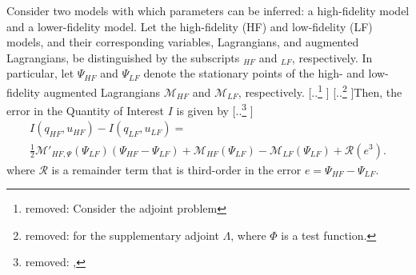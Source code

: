 \documentclass[review]{siamart0516}
\providecommand{\DIFdeltex}[1]{{\protect\color{red} [..\footnote{removed: #1} ]}} %
\providecommand{\DIFaddbegin}{} %
\providecommand{\DIFaddend}{} %
\providecommand{\DIFdelbegin}{} %
\providecommand{\DIFdelend}{} %
\providecommand{\DIFdel}[1]{\texorpdfstring{\DIFdeltex{#1}}{}} %
\newcommand{\DIFscaledelfig}{0.5}
\newlength{\DIFdelgraphicswidth} %
\newlength{\DIFdelgraphicsheight} %
\newcommand{\DIFaddincludegraphics}[2][]{{\color{blue}\fbox{\DIFOincludegraphics[#1]{#2}}}} %
\newcommand{\DIFdelincludegraphics}[2][]{%
\sbox{\DIFdelgraphicsbox}{\DIFOincludegraphics[#1]{#2}}%
\settoboxwidth{\DIFdelgraphicswidth}{\DIFdelgraphicsbox} %
\settoboxtotalheight{\DIFdelgraphicsheight}{\DIFdelgraphicsbox} %
\scalebox{\DIFscaledelfig}{%
\parbox[b]{\DIFdelgraphicswidth}{\usebox{\DIFdelgraphicsbox}\\[-\baselineskip] \rule{\DIFdelgraphicswidth}{0em}}\llap{\resizebox{\DIFdelgraphicswidth}{\DIFdelgraphicsheight}{%
\setlength{\unitlength}{\DIFdelgraphicswidth}%
\begin{picture}(1,1)%
\thicklines\linethickness{2pt} %
{\color[rgb]{1,0,0}\put(0,0){\framebox(1,1){}}}%
{\color[rgb]{1,0,0}\put(0,0){\line( 1,1){1}}}%
{\color[rgb]{1,0,0}\put(0,1){\line(1,-1){1}}}%
\end{picture}%
}\hspace*{3pt}}} %
} %
\DeclareRobustCommand{\DIFaddbegin}{\DIFOaddbegin \let\includegraphics\DIFaddincludegraphics} %
\DeclareRobustCommand{\DIFaddend}{\DIFOaddend \let\includegraphics\DIFOincludegraphics} %
\DeclareRobustCommand{\DIFdelbegin}{\DIFOdelbegin \let\includegraphics\DIFdelincludegraphics} %
\DeclareRobustCommand{\DIFdelend}{\DIFOaddend \let\includegraphics\DIFOincludegraphics} %
\begin{document}
\begin{proposition}
Consider two models with which parameters can be inferred: a high-fidelity model and a lower-fidelity model. Let the high-fidelity (HF) and low-fidelity (LF) models, and their corresponding variables, Lagrangians, and augmented Lagrangians, be distinguished by the subscripts $_{HF}$ and $_{LF}$, respectively. In particular, let $\Psi_{HF}$ and $\Psi_{LF}$ denote the stationary points of the high- and low- fidelity augmented Lagrangians $\mathcal{M}_{HF}$ and $\mathcal{M}_{LF}$, respectively. 
\DIFdelbegin \DIFdel{Consider the adjoint problem
}%
\DIFdel{for the supplementary adjoint $\Lambda$, where $\Phi$ is a test function. }\DIFdelend Then, the error in the Quantity of Interest $I$ is given by
\DIFdelbegin \DIFdel{,
}\DIFdelend %
\DIFdelbegin %
\DIFdelend \DIFaddbegin \begin{multline}
\label{eq:semifinErrExp}
I(q_{HF},u_{HF})-I(q_{LF},u_{LF})=\\\frac{1}{2}\mathcal{M}'_{HF,\Psi}(\Psi_{LF})(\Psi_{HF}-\Psi_{LF})+\mathcal{M}_{HF}(\Psi_{LF})-\mathcal{M}_{LF}(\Psi_{LF})+\mathcal{R}(e^3)\textrm{.}
\end{multline}
\DIFaddend %
where $\mathcal{R}$ is a remainder term that is third-order in the error $e=\Psi_{HF}-\Psi_{LF}$.
\DIFdelbegin %
\DIFdelend \DIFaddbegin \end{proposition}
\end{document}
